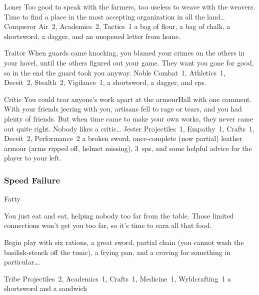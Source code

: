 \begin{multicols}{2}
\begin{itemize}
    {Loner}%
    {Too good to speak with the farmers, too useless to weave with the weavers.
      Time to find a place in the most accepting organization in all the land\ldots}%
    {Conqueror}%
    {
      Air~2, Academics~2, Tactics~1
    }%
    {a bag of flour, a bag of chalk, a shortsword, a dagger, and an unopened letter from home.}%

    {Traitor}%
    {
      When guards came knocking, you blamed your crimes on the others in your hovel, until the others figured out your game.
      They want you gone for good, so in the end the \gls{guard} took you anyway.
    }%
    {Noble}%
    {
      Combat~1, Athletics~1, Deceit~2, Stealth~2, Vigilance~1,
    }%
    {a shortsword, a dagger, and  \glspl{cp}.}%

    {Critic}%
    {
      You could tear anyone's work apart at the \gls{armourHall} with one comment.
      With your friends jeering with you, artisans fell to rage or tears, and you had plenty of friends.
      But when time came to make your own works, they never came out quite right.
      Nobody likes a critic\ldots
    }%
    {Jester}%
    {
      Projectiles~1, Empathy~1, Crafts~1, Deceit~2, Performance~2
    }%
    {a broken sword, once-complete (now partial) leather armour (arms ripped off, helmet missing), 3~\glspl{sp}, and some helpful advice for the player to your left.}%

\end{itemize}

\needspace{10em}
\subsubsection{Speed Failure}

\begin{itemize}

    {Fatty}%
    {
      You just eat and eat, helping nobody too far from the table.
      Those limited connections won't get you too far, so it's time to earn all that food.

      Begin play with six rations, a great sword, partial chain (you cannot wash the basilisk-stench off the tunic), a frying pan, and a craving for something in particular\ldots.
    }%
    {Tribe}%
    {Projectiles~2, Academics~1, Crafts~1, Medicine~1, Wyldcrafting~1}%
    {a shortsword and a sandwich}%


\end{itemize}
\end{multicols}
